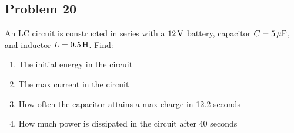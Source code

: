 \subsection*{Problem 20}
An LC circuit is constructed in series with a $12\,\mathrm{V}$ battery, capacitor $C = 5\,\mathrm{\mu F}$, and
inductor $L = 0.5\,\mathrm{H}$. Find:
\begin{enumerate}
    \item The initial energy in the circuit
    \item The max current in the circuit
    \item How often the capacitor attains a max charge in 12.2 seconds
    \item How much power is dissipated in the circuit after 40 seconds
\end{enumerate}